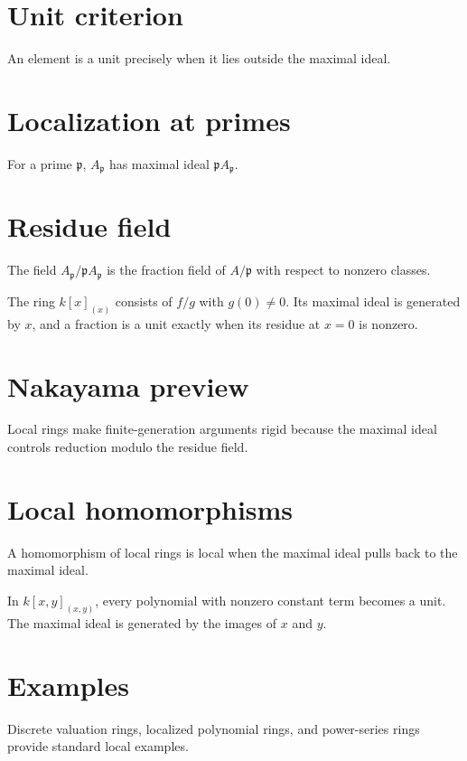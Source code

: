 \section{Unit criterion}
An element is a unit precisely when it lies outside the maximal ideal.

\section{Localization at primes}
For a prime $\mathfrak p$, $A_{\mathfrak p}$ has maximal ideal $\mathfrak p A_{\mathfrak p}$.

\section{Residue field}
The field $A_{\mathfrak p}/\mathfrak p A_{\mathfrak p}$ is the fraction field of $A/\mathfrak p$ with respect to nonzero classes.

\begin{example}\label{ex:v08-expand-02}
The ring $k[x]_{(x)}$ consists of $f/g$ with $g(0)\ne0$. Its maximal ideal is generated by $x$, and a fraction is a unit exactly when its residue at $x=0$ is nonzero.
\end{example}
\section{Nakayama preview}
Local rings make finite-generation arguments rigid because the maximal ideal controls reduction modulo the residue field.

\section{Local homomorphisms}
A homomorphism of local rings is local when the maximal ideal pulls back to the maximal ideal.

\begin{example}\label{ex:v08-expand-03}
In $k[x,y]_{(x,y)}$, every polynomial with nonzero constant term becomes a unit. The maximal ideal is generated by the images of $x$ and $y$.
\end{example}
\section{Examples}
Discrete valuation rings, localized polynomial rings, and power-series rings provide standard local examples.

